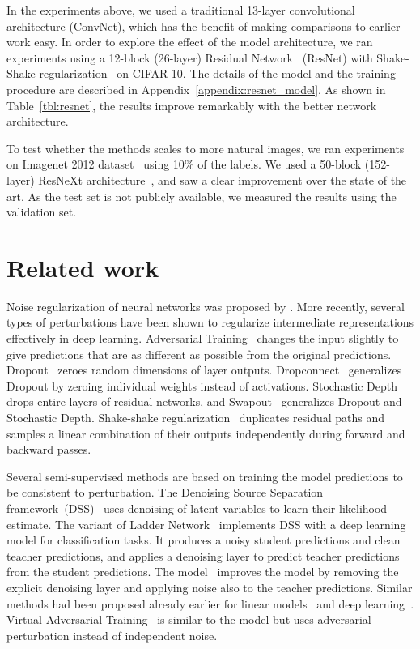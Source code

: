 \documentclass{article}
\begin{document}
In the experiments above, we used a traditional 13-layer convolutional architecture (ConvNet), which has the benefit of making comparisons to earlier work easy.
In order to explore the effect of the model architecture, we ran experiments using a 12-block (26-layer) Residual Network~\citep{he_deep_2015} (ResNet) with Shake-Shake regularization~\citep{gastaldi_shake-shake_2017} on CIFAR-10.
The details of the model and the training procedure are described in Appendix~\ref{appendix:resnet_model}.
As shown in Table~\ref{tbl:resnet}, the results improve remarkably with the better network architecture.

To test whether the methods scales to more natural images, we ran experiments on Imagenet 2012 dataset~\citep{russakovsky_imagenet_2014} using 10\% of the labels.
We used a 50-block (152-layer) ResNeXt architecture~\citep{xie_aggregated_2016}, and saw a clear improvement over the state of the art.
As the test set is not publicly available, we measured the results using the validation set.

\section{Related work}

Noise regularization of neural networks was proposed by \citet{sietsma_creating_1991}.
More recently, several types of perturbations have been shown to regularize intermediate representations effectively in deep learning.
Adversarial Training~\citep{goodfellow_explaining_2014} changes the input slightly to give predictions that are as different as possible from the original predictions.
Dropout~\citep{srivastava_dropout:_2014} zeroes random dimensions of layer outputs.
Dropconnect~\citep{wan_regularization_2013} generalizes Dropout by zeroing individual weights instead of activations.
Stochastic Depth~\citep{huang_deep_2016} drops entire layers of residual networks, and Swapout~\citep{singh_swapout:_2016} generalizes Dropout and Stochastic Depth.
Shake-shake regularization~\citep{gastaldi_shake-shake_2017} duplicates residual paths and samples a linear combination of their outputs independently during forward and backward passes.

Several semi-supervised methods are based on training the model predictions to be consistent to perturbation.
The Denoising Source Separation framework~(DSS)~\citep{sarela_denoising_2005} uses denoising of latent variables to learn their likelihood estimate.
The  variant of Ladder Network~\citep{rasmus_semi-supervised_2015} implements DSS with a deep learning model for classification tasks.
It produces a noisy student predictions and clean teacher predictions, and applies a denoising layer to predict teacher predictions from the student predictions.
The  model~\citep{laine_temporal_2016} improves the  model by removing the explicit denoising layer and applying noise also to the teacher predictions.
Similar methods had been proposed already earlier for linear models~\citep{wager_dropout_2013} and deep learning~\citep{bachman_learning_2014}.
Virtual Adversarial Training~\citep{miyato_virtual_2017} is similar to the  model but uses adversarial perturbation instead of independent noise.
\end{document}
